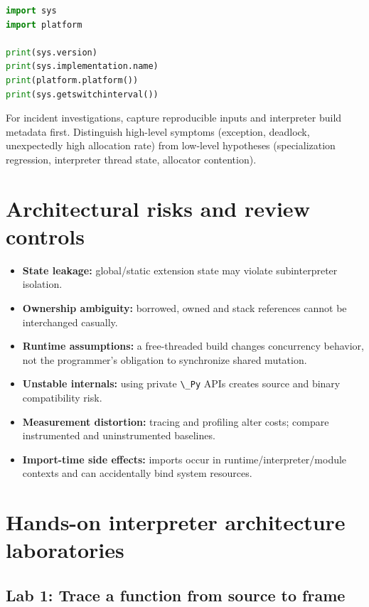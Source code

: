 \documentclass[
  11pt,
]{report}
\newcommand{\passthrough}[1]{#1}
\providecommand{\tightlist}{%
  \setlength{\itemsep}{0pt}\setlength{\parskip}{0pt}}
\begin{document}
\begin{lstlisting}[language=Python]
import sys
import platform

print(sys.version)
print(sys.implementation.name)
print(platform.platform())
print(sys.getswitchinterval())
\end{lstlisting}

For incident investigations, capture reproducible inputs and interpreter
build metadata first. Distinguish high-level symptoms (exception,
deadlock, unexpectedly high allocation rate) from low-level hypotheses
(specialization regression, interpreter thread state, allocator
contention).

\chapter{Architectural risks and review
controls}\label{architectural-risks-and-review-controls}

\begin{itemize}
\tightlist
\item
  \textbf{State leakage:} global/static extension state may violate
  subinterpreter isolation.
\item
  \textbf{Ownership ambiguity:} borrowed, owned and stack references
  cannot be interchanged casually.
\item
  \textbf{Runtime assumptions:} a free-threaded build changes
  concurrency behavior, not the programmer's obligation to synchronize
  shared mutation.
\item
  \textbf{Unstable internals:} using private
  \passthrough{\lstinline!\_Py!} APIs creates source and binary
  compatibility risk.
\item
  \textbf{Measurement distortion:} tracing and profiling alter costs;
  compare instrumented and uninstrumented baselines.
\item
  \textbf{Import-time side effects:} imports occur in
  runtime/interpreter/module contexts and can accidentally bind system
  resources.
\end{itemize}

\chapter{Hands-on interpreter architecture
laboratories}\label{hands-on-interpreter-architecture-laboratories}

\section{Lab 1: Trace a function from source to
frame}\label{lab-1-trace-a-function-from-source-to-frame}
\end{document}
